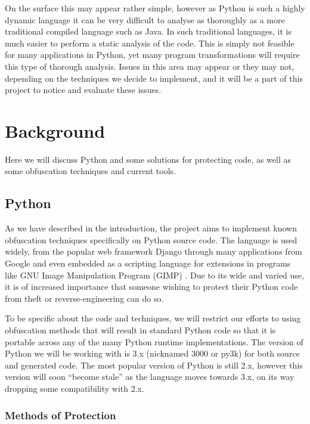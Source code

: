 \documentclass[twoside,a4paper]{report}
\begin{document}
On the surface this may appear rather simple, however as Python is such a highly dynamic language it can be very difficult to analyse
\cite[p13]{staticanal} as thoroughly as a more traditional compiled language such as Java. In such traditional languages, it is much easier to perform a static
analysis of the code. This is simply not feasible for many applications in Python, yet many program transformations will require this type of
thorough analysis. Issues in this area may appear or they may not, depending on the techniques we decide to implement, and it will be a part of
this project to notice and evaluate these issues.

\section{Background}

Here we will discuss Python and some solutions for protecting code, as well as some obfuscation techniques
and current tools.

\subsection{Python}

As we have described in the introduction, the project aims to implement known obfuscation techniques specifically on Python source code.
The language is used widely, from the popular web framework Django \cite{django} through many applications
from Google \cite{pygoogle} and even embedded as a scripting language for extensions in programs like GNU
Image Manipulation Program (GIMP) \cite{gimp}. Due to its wide and varied use, it is of increased importance
that someone wishing to protect their Python code from theft or reverse-engineering can do so.

To be specific about the code and techniques, we will restrict our efforts to using obfuscation methods that will
result in standard Python code so that it is portable across any of the many Python runtime implementations. The version
of Python we will be working with is 3.x (nicknamed 3000 or py3k) for both source and generated code. The most popular
version of Python is still 2.x, however this version will soon ``become stale'' as the language moves towards 3.x, on its way
dropping some compatibility with 2.x.

\subsubsection{Methods of Protection}
\end{document}
